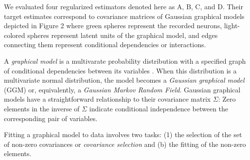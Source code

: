 We evaluated four regularized estimators denoted here as A, B, C, and D.  Their target estimates correspond to covariance matrices of Gaussian graphical models depicted in Figure 2 where green spheres represent the recorded neurons,  light-colored spheres represent latent units of the graphical model, and edges connecting them represent conditional dependencies or interactions.



A \emph{graphical model} is a multivarate probability distribution with a specified graph of conditional dependencies between its variables \cite{Koller:2009}.  When this distribution is a multivariate normal distribution, the model becomes a \emph{Gaussian graphical model} (GGM) or, equivalently, a \emph{Gaussian Markov Random Field}.  Gaussian graphical models have a straightforward relationship to their covariance matrix $\Sigma$:  Zero elements in the inverse of $\Sigma$ indicate conditional independence between the corresponding pair of variables.  

Fitting a graphical model to data involves two tasks: (1) the selection of the set of non-zero covariances or \emph{covariance selection} \cite{Dempster:1972} and (b) the fitting of the non-zero elements.

